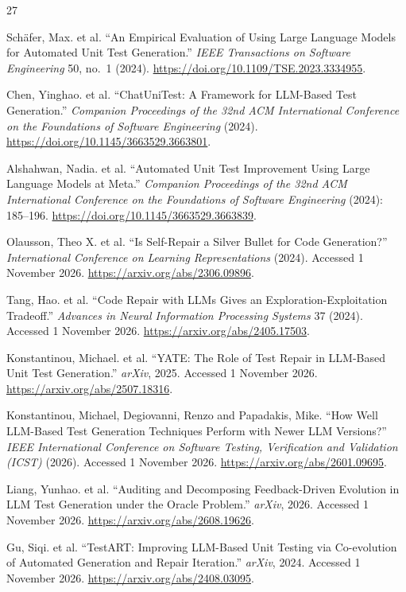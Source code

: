 \documentclass[11pt,a4paper]{article}
\begin{document}
\begin{thebibliography}{27}

Sch{\"a}fer, Max. et al. ``An Empirical Evaluation of Using Large Language Models for Automated Unit Test Generation.'' \emph{IEEE Transactions on Software Engineering} 50, no.~1 (2024). \url{https://doi.org/10.1109/TSE.2023.3334955}.

Chen, Yinghao. et al. ``ChatUniTest: A Framework for LLM-Based Test Generation.'' \emph{Companion Proceedings of the 32nd ACM International Conference on the Foundations of Software Engineering} (2024). \url{https://doi.org/10.1145/3663529.3663801}.

Alshahwan, Nadia. et al. ``Automated Unit Test Improvement Using Large Language Models at Meta.'' \emph{Companion Proceedings of the 32nd ACM International Conference on the Foundations of Software Engineering} (2024): 185--196. \url{https://doi.org/10.1145/3663529.3663839}.

Olausson, Theo X. et al. ``Is Self-Repair a Silver Bullet for Code Generation?'' \emph{International Conference on Learning Representations} (2024). Accessed 1 November 2026. \url{https://arxiv.org/abs/2306.09896}.

Tang, Hao. et al. ``Code Repair with LLMs Gives an Exploration-Exploitation Tradeoff.'' \emph{Advances in Neural Information Processing Systems} 37 (2024). Accessed 1 November 2026. \url{https://arxiv.org/abs/2405.17503}.

Konstantinou, Michael. et al. ``YATE: The Role of Test Repair in LLM-Based Unit Test Generation.'' \emph{arXiv}, 2025. Accessed 1 November 2026. \url{https://arxiv.org/abs/2507.18316}.

Konstantinou, Michael, Degiovanni, Renzo and Papadakis, Mike. ``How Well LLM-Based Test Generation Techniques Perform with Newer LLM Versions?'' \emph{IEEE International Conference on Software Testing, Verification and Validation (ICST)} (2026). Accessed 1 November 2026. \url{https://arxiv.org/abs/2601.09695}.

Liang, Yunhao. et al. ``Auditing and Decomposing Feedback-Driven Evolution in LLM Test Generation under the Oracle Problem.'' \emph{arXiv}, 2026. Accessed 1 November 2026. \url{https://arxiv.org/abs/2608.19626}.

Gu, Siqi. et al. ``TestART: Improving LLM-Based Unit Testing via Co-evolution of Automated Generation and Repair Iteration.'' \emph{arXiv}, 2024. Accessed 1 November 2026. \url{https://arxiv.org/abs/2408.03095}.


\end{thebibliography}
\end{document}
